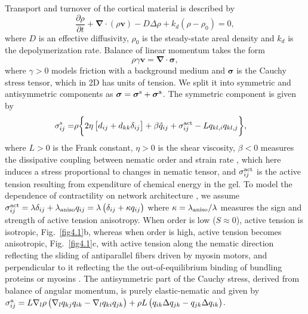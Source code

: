 Transport and turnover of the cortical material is described by 
\begin{equation} \label{eq_thick}
	\frac{\partial \rho }{\partial t} + \bm{\nabla} \cdot \left ( \rho \bm{v} \right) - D \Delta \rho + k_d(\rho-\rho_0)=0,
\end{equation}
where $D$ is an effective diffusivity, $\rho_0$ is the steady-state areal density and $k_d$ is the depolymerization rate. Balance of linear momentum takes the form
\begin{equation} \label{eq_lin_mom}
	\rho \gamma \bm{v} = \bm{\nabla} \cdot \bm{\sigma},
\end{equation}
where $\gamma>0$ models friction with a background medium and  $\bm{\sigma}$ is the Cauchy stress tensor, which in 2D has units of tension. We split it into symmetric and antisymmetric components as $\bm{\sigma} = \bm{\sigma}^{\rm s} + \bm{\sigma}^{\rm a}$. The symmetric component is given by
\begin{align}
	{\sigma}^{\rm s}_{ij} = & \rho \bigg\{  2\eta \left[ d_{ij} + d_{kk} \delta_{ij}\right]+ \beta  \hat{{q}}_{ij}  + {\sigma}^{\rm act}_{ij} - L q_{kl,i} q_{kl,j}  \bigg\},  \label{symm_stress} 
\end{align}
where $L>0$ is the Frank constant, $\eta>0$ is the shear viscosity, $\beta<0$ measures the dissipative coupling between nematic order and strain rate \cite{anne2016}, which here induces a stress proportional to changes in nematic tensor, and  ${\sigma}^{\rm act}_{ij}$ is the active tension resulting from expenditure of chemical energy in the gel. To model the dependence of contractility on network architecture \cite{Ennomani2016}, we assume ${\sigma}^{\rm act}_{ij} = \lambda \delta_{ij} + \lambda_{\rm aniso} q_{ij} = \lambda \left( \delta_{ij}  + \kappa q_{ij} \right)$ where $\kappa = \lambda_{\rm aniso}/\lambda$ measures the sign and strength of active tension anisotropy. When order is low ($S\approx 0$), active tension is isotropic, Fig.~\ref{fig4.1}b, whereas when order is high, active tension becomes anisotropic, Fig.~\ref{fig4.1}c, with active tension along the nematic direction reflecting the sliding of antiparallel fibers driven by myosin motors, and perpendicular to it reflecting the the out-of-equilibrium binding of bundling proteins or myosins \cite{harris2006,courson2010,blanchoin2014,schuppler2016,li2017,nandi2018,Ennomani2016,chen2020}. The antisymmetric part of the Cauchy stress, derived from balance of angular momentum, is purely elastic-nematic and given by ${\sigma}^{\rm a}_{ij} =  L \nabla_l \rho \left( \nabla_l q_{kj} q_{ik} - \nabla_l q_{ki} q_{jk} \right) + \rho L  \left( q_{ik}\Delta q_{jk}  -q_{jk}  \Delta q_{ik}  \right)$.

